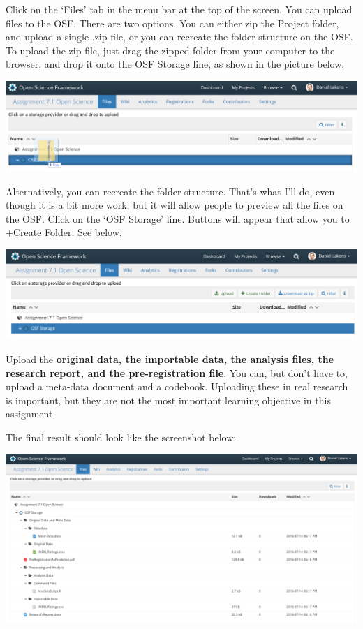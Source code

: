 \documentclass[
  oneside]{krantz}
\begin{document}
Click on the `Files' tab in the menu bar at the top of the screen. You can upload files to the OSF. There are two options. You can either zip the Project folder, and upload a single .zip file, or you can recreate the folder structure on the OSF. To upload the zip file, just drag the zipped folder from your computer to the browser, and drop it onto the OSF Storage line, as shown in the picture below.

\begin{center}\includegraphics[width=1\linewidth]{images/8b43efb2aa9c69d3e8786473113660ba} \end{center}

Alternatively, you can recreate the folder structure. That's what I'll do, even though it is a bit more work, but it will allow people to preview all the files on the OSF. Click on the `OSF Storage' line. Buttons will appear that allow you to +Create Folder. See below.

\begin{center}\includegraphics[width=1\linewidth]{images/380c79d73f62591732aafcd0a045ea2b} \end{center}

Upload the \textbf{original data, the importable data, the analysis files, the research report, and the pre-registration file}. You can, but don't have to, upload a meta-data document and a codebook. Uploading these in real research is important, but they are not the most important learning objective in this assignment.

The final result should look like the screenshot below:

\begin{center}\includegraphics[width=1\linewidth]{images/dec08b890995634acf624123962ed970} \end{center}
\end{document}
